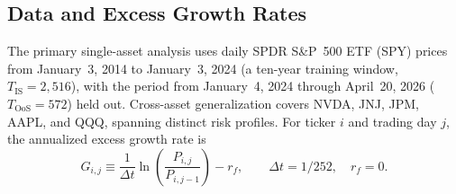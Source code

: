 \subsection{Data and Excess Growth Rates}
\label{sec:data}

The primary single-asset analysis uses daily SPDR S\&P~500 ETF (SPY) prices from January~3, 2014 to January~3, 2024 (a ten-year training window, $T_{\text{IS}} = 2{,}516$), with the period from January~4, 2024 through April~20, 2026 ($T_{\text{OoS}} = 572$) held out.
Cross-asset generalization covers NVDA, JNJ, JPM, AAPL, and QQQ, spanning distinct risk profiles.
For ticker $i$ and trading day $j$, the annualized excess growth rate is
\begin{equation}
    G_{i,j} \equiv \frac{1}{\Delta t} \ln\!\left(\frac{P_{i,j}}{P_{i,j-1}}\right) - r_f,
    \qquad \Delta t = 1/252, \quad r_f = 0.
    \label{eq:growth_rate}
\end{equation}

